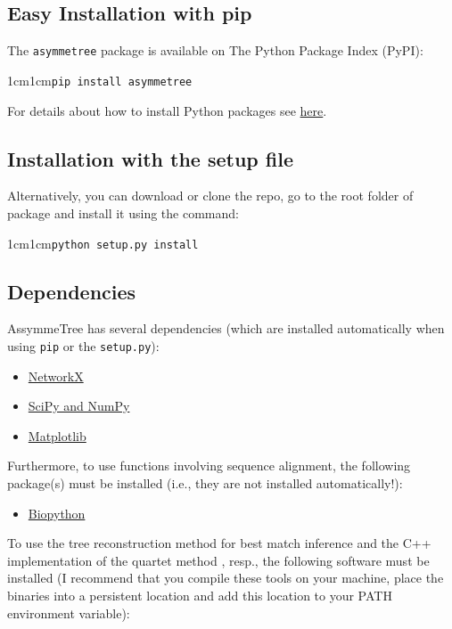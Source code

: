 \documentclass[hidelinks,11pt]{scrreprt}
\newcommand{\COMMANDLINE}[1]{\begingroup\par\vspace{3mm}\color{darkgrey}\begin{adjustwidth}{1cm}{1cm}\texttt{#1}\end{adjustwidth}\vspace{3mm}\endgroup}
\begin{document}
\subsection{Easy Installation with pip}


The \texttt{asymmetree} package is available on The Python Package Index (PyPI):

\COMMANDLINE{pip install asymmetree}

\noindent
For details about how to install Python packages see
\href{https://packaging.python.org/tutorials/installing-packages/}{here}.

\subsection{Installation with the setup file}


Alternatively, you can download or clone the repo, go to the root folder of package and install it using the command:

\COMMANDLINE{python setup.py install}


\subsection{Dependencies}

AssymmeTree has several dependencies (which are installed automatically when using \texttt{pip} or the \texttt{setup.py}):

\begin{itemize}
	\item \href{https://networkx.github.io}{NetworkX}
	\item \href{http://www.scipy.org/install.html}{SciPy and NumPy}
	\item \href{https://matplotlib.org/}{Matplotlib}
\end{itemize}

Furthermore, to use functions involving sequence alignment, the following package(s) must be installed (i.e., they are not installed automatically!):

\begin{itemize}
	\item \href{http://biopython.org/wiki/Download}{Biopython} \citep{cock2009}
\end{itemize}

To use the tree reconstruction method for best match inference and the C++ implementation of the quartet method \citep{stadler2020}, resp., the following software must be installed
(I recommend that you compile these tools on your machine, place the binaries into a persistent location and add this location to your PATH environment variable):
\end{document}
